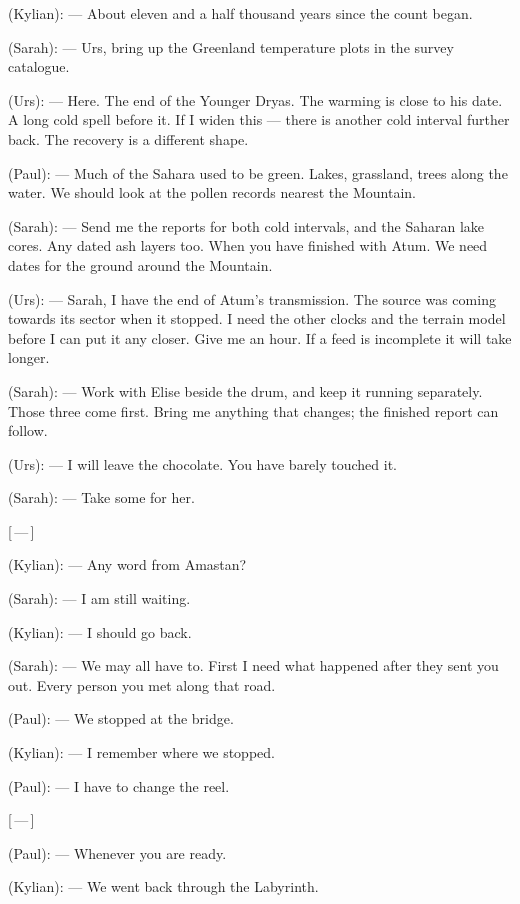 \begin{room}
(Kylian): --- About eleven and a half thousand years since the count began.

(Sarah): --- Urs, bring up the Greenland temperature plots in the survey catalogue.

(Urs): --- Here. The end of the Younger Dryas. The warming is close to his date. A long cold spell before it. If I widen this --- there is another cold interval further back. The recovery is a different shape.

(Paul): --- Much of the Sahara used to be green. Lakes, grassland, trees along the water. We should look at the pollen records nearest the Mountain.

(Sarah): --- Send me the reports for both cold intervals, and the Saharan lake cores. Any dated ash layers too. When you have finished with Atum. We need dates for the ground around the Mountain.

(Urs): --- Sarah, I have the end of Atum's transmission. The source was coming towards its sector when it stopped. I need the other clocks and the terrain model before I can put it any closer. Give me an hour. If a feed is incomplete it will take longer.

(Sarah): --- Work with Elise beside the drum, and keep it running separately. Those three come first. Bring me anything that changes; the finished report can follow.

(Urs): --- I will leave the chocolate. You have barely touched it.

(Sarah): --- Take some for her.

\centerline{[\,---\,]}

(Kylian): --- Any word from Amastan?

(Sarah): --- I am still waiting.

(Kylian): --- I should go back.

(Sarah): --- We may all have to. First I need what happened after they sent you out. Every person you met along that road.

(Paul): --- We stopped at the bridge.

(Kylian): --- I remember where we stopped.

(Paul): --- I have to change the reel.

\centerline{[\,---\,]}

(Paul): --- Whenever you are ready.

(Kylian): --- We went back through the Labyrinth.

\end{room}
